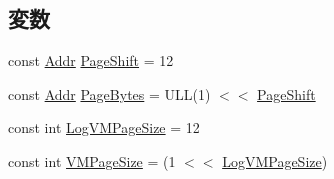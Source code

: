 \subsection*{変数}
\begin{DoxyCompactItemize}
\item 
const \hyperlink{base_2types_8hh_af1bb03d6a4ee096394a6749f0a169232}{Addr} \hyperlink{namespaceNullISA_a6eacddc1d6d191380d9afdac5920ea48}{PageShift} = 12
\item 
const \hyperlink{base_2types_8hh_af1bb03d6a4ee096394a6749f0a169232}{Addr} \hyperlink{namespaceNullISA_ad9d6a4d965e107c9a7214f096107296b}{PageBytes} = ULL(1) $<$$<$ \hyperlink{namespaceNullISA_a6eacddc1d6d191380d9afdac5920ea48}{PageShift}
\item 
const int \hyperlink{namespaceNullISA_a554fef169d109a5ccb7ce0dd6a43e521}{LogVMPageSize} = 12
\item 
const int \hyperlink{namespaceNullISA_a891eaf95159d764e6efae501c2860a3a}{VMPageSize} = (1 $<$$<$ \hyperlink{namespaceNullISA_a554fef169d109a5ccb7ce0dd6a43e521}{LogVMPageSize})
\end{DoxyCompactItemize}


